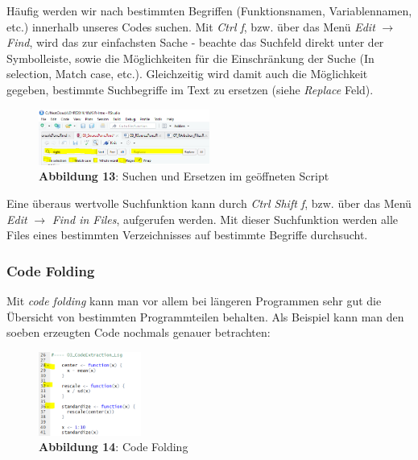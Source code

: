 \documentclass[]{article}
\begin{document}
Häufig werden wir nach bestimmten Begriffen (Funktionsnamen,
Variablennamen, etc.) innerhalb unseres Codes suchen. Mit \emph{Ctrl f},
bzw. über das Menü \emph{Edit} \(\rightarrow\) \emph{Find}, wird das zur
einfachsten Sache - beachte das Suchfeld direkt unter der Symbolleiste,
sowie die Möglichkeiten für die Einschränkung der Suche (In selection,
Match case, etc.). Gleichzeitig wird damit auch die Möglichkeit gegeben,
bestimmte Suchbegriffe im Text zu ersetzen (siehe \emph{Replace} Feld).

\begin{figure}
\centering
\includegraphics[width=0.50000\textwidth]{Images/03_R_SucheErsetzen.PNG}
\caption{\textbf{Abbildung 13}: Suchen und Ersetzen im geöffneten
Script}
\end{figure}

Eine überaus wertvolle Suchfunktion kann durch \emph{Ctrl Shift f}, bzw.
über das Menü \emph{Edit} \(\rightarrow\) \emph{Find in Files},
aufgerufen werden. Mit dieser Suchfunktion werden alle Files eines
bestimmten Verzeichnisses auf bestimmte Begriffe durchsucht.

\subsubsection*{Code Folding}\label{code-folding}

Mit \emph{code folding} kann man vor allem bei längeren Programmen sehr
gut die Übersicht von bestimmten Programmteilen behalten. Als Beispiel
kann man den soeben erzeugten Code nochmals genauer betrachten:

\begin{figure}
\centering
\includegraphics[width=0.30000\textwidth]{Images/03_R_CodeFoling.PNG}
\caption{\textbf{Abbildung 14}: Code Folding}
\end{figure}
\end{document}
